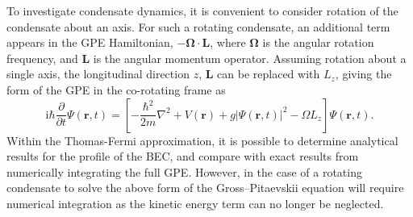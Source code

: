 To investigate condensate dynamics, it is convenient to consider rotation of the condensate about an axis. For such a rotating condensate, an additional term appears in the GPE Hamiltonian, $-\mathbf{\Omega}\cdot \mathbf{L}$, where $\mathbf{\Omega}$ is the angular rotation frequency, and $\mathbf{L}$ is the angular momentum operator. Assuming rotation about a single axis, the longitudinal direction $z$, $\mathbf{L}$ can be replaced with $L_z$, giving the form of the GPE in the co-rotating frame as
\begin{equation}\label{eqn:gpe_rotation}
\textrm{i}\hbar\frac{\partial}{\partial t}\Psi(\mathbf{r},t) = \left[-\frac{\hbar^2}{2m}\nabla^2 + V(\mathbf{r}) + g\vert\Psi(\textbf{r},t)\vert^2 - \Omega L_z  \right]\Psi(\mathbf{r},t).
\end{equation}
Within the Thomas-Fermi approximation, it is possible to determine analytical results for the profile of the BEC, and compare with exact results from numerically integrating the full GPE. However, in the case of a rotating condensate to solve the above form of the Gross--Pitaevskii equation will require numerical integration as the kinetic energy term can no longer be neglected.

